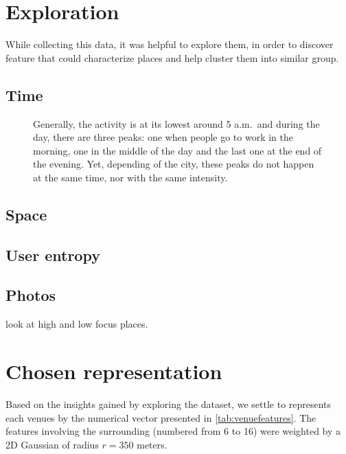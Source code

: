 \section{Exploration}

While collecting this data, it was helpful to explore them, in order to
discover feature that could characterize places and help cluster them into
similar group.

\subsection{Time}
\autocite{UrbanStory12}
\autocite{TimeCluster13}

\begin{figure}[hbt]
    \centering
    \iftoggle{EXTERNALPGF}{%
        \texttt{[image: daily\_checkin]}
    }{%
        
    }
    \caption[Pattern of check-in during the day]{Generally, the activity is at
    its lowest around 5 a.m.\ and during the day, there are three peaks: one
when people go to work in the morning, one in the middle of the day and the
last one at the end of the evening. Yet, depending of the city, these peaks do
not happen at the same time, nor with the same intensity.
\label{fig:daily_checkin}}
\end{figure}

\subsection{Space}

\subsection{User entropy}

\subsection{Photos}
look at high and low focus places.

\section{Chosen representation}

Based on the insights gained by exploring the dataset, we settle to represents
each venues by the numerical vector presented in \autoref{tab:venuefeatures}.
The features involving the surrounding (numbered from 6 to 16) were weighted
by a 2D Gaussian of radius $r=350$ meters.

